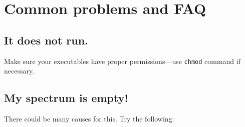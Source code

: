 \documentclass[11pt]{article}
\begin{document}
\clearpage
\section{Common problems and FAQ}

\subsection{It does not run.}

Make sure your executables have proper permissions---use {\tt chmod} command if necessary. 

\subsection{My spectrum is empty!}
\label{sec:emptyspec}

There could be many causes for this. Try the following:
\end{document}
